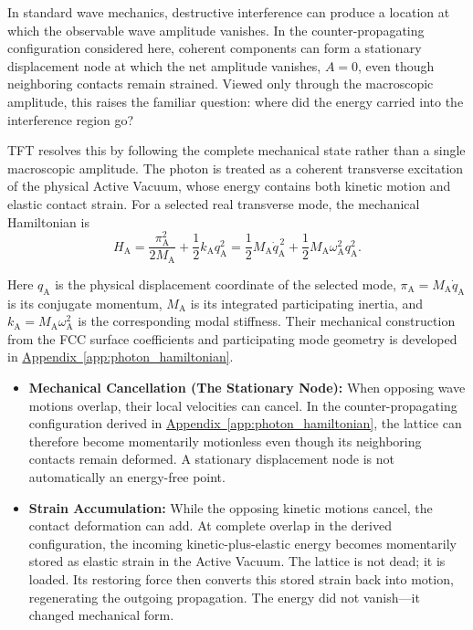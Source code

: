 In standard wave mechanics, destructive interference can produce a location at which the observable wave amplitude vanishes. In the counter-propagating configuration considered here, coherent components can form a stationary displacement node at which the net amplitude vanishes, $A=0$, even though neighboring contacts remain strained. Viewed only through the macroscopic amplitude, this raises the familiar question: where did the energy carried into the interference region go?

TFT resolves this by following the complete mechanical state rather than a single macroscopic amplitude. The photon is treated as a coherent transverse excitation of the physical Active Vacuum, whose energy contains both kinetic motion and elastic contact strain. For a selected real transverse mode, the mechanical Hamiltonian is
\begin{equation}
    H_{\mathrm A}
    =
    \frac{\pi_{\mathrm A}^{2}}{2M_{\mathrm A}}
    +
    \frac{1}{2}k_{\mathrm A}q_{\mathrm A}^{2}
    =
    \frac{1}{2}M_{\mathrm A}\dot q_{\mathrm A}^{\,2}
    +
    \frac{1}{2}M_{\mathrm A}\omega_{\mathrm A}^{2}q_{\mathrm A}^{2}.
\end{equation}

Here $q_{\mathrm A}$ is the physical displacement coordinate of the selected mode, $\pi_{\mathrm A}=M_{\mathrm A}\dot q_{\mathrm A}$ is its conjugate momentum, $M_{\mathrm A}$ is its integrated participating inertia, and $k_{\mathrm A}=M_{\mathrm A}\omega_{\mathrm A}^{2}$ is the corresponding modal stiffness. Their mechanical construction from the FCC surface coefficients and participating mode geometry is developed in
\hyperref[app:photon_hamiltonian]{Appendix~\ref*{app:photon_hamiltonian}}.

\begin{itemize}
    \item \textbf{Mechanical Cancellation (The Stationary Node):}
    When opposing wave motions overlap, their local velocities can cancel. In the counter-propagating configuration derived in \hyperref[app:photon_hamiltonian]{Appendix~\ref*{app:photon_hamiltonian}}, the lattice can therefore become momentarily motionless even though its neighboring contacts remain deformed. A stationary displacement node is not automatically an energy-free point.

    \item \textbf{Strain Accumulation:}
    While the opposing kinetic motions cancel, the contact deformation can add. At complete overlap in the derived configuration, the incoming kinetic-plus-elastic energy becomes momentarily stored as elastic strain in the Active Vacuum. The lattice is not dead; it is loaded. Its restoring force then converts this stored strain back into motion, regenerating the outgoing propagation. The energy did not vanish---it changed mechanical form.
\end{itemize}

